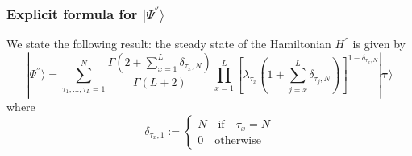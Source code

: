 \documentclass[10pt]{article}
\numberwithin{equation}{section}
\numberwithin{equation}{subsection}
\begin{document}
\subsubsection{Explicit formula for $|\Psi^{''}\rangle$}\label{subsectionSSHsec}
We state the following result: the steady state of the Hamiltonian $H^{''}$ is given by 
\begin{equation}\label{ResulsBasis}
	|\Psi^{''} \rangle=\sum_{\tau_{1},\ldots,\tau_{L}=1}^{N}\frac{\Gamma\left(2+\sum_{x=1}^{L}\delta_{\tau_{x},N}\right)}{\Gamma\left(L+2\right)}\prod_{x=1}^{L}\left[\lambda_{\tau_{x}}\left(1+\sum_{j=x}^{L}\delta_{\tau_{j},N}\right)\right]^{1-\delta_{\tau_{x},N}}|\mathbf{\bm{\tau}}\rangle
\end{equation}
where 
\begin{equation}
    \delta_{\tau_{x},1}:=\begin{cases}
        N\quad \text{if}\quad \tau_{x}=N\\
        0\quad \text{otherwise}
    \end{cases}
\end{equation}
\end{document}
